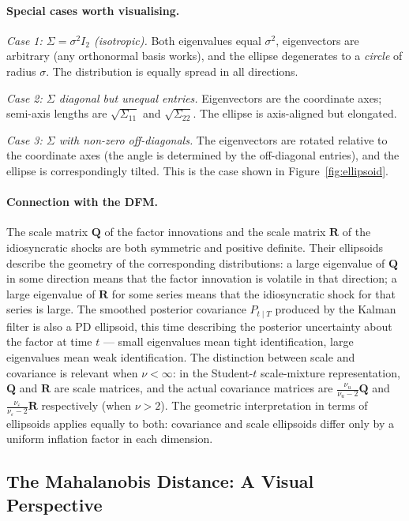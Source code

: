 \documentclass[11pt, a4paper, oneside]{article}
\begin{document}
\paragraph{Special cases worth visualising.}

\emph{Case 1: $\Sigma = \sigma^2 I_2$ (isotropic).} Both eigenvalues
equal $\sigma^2$, eigenvectors are arbitrary (any orthonormal basis
works), and the ellipse degenerates to a \emph{circle} of radius
$\sigma$. The distribution is equally spread in all directions.

\emph{Case 2: $\Sigma$ diagonal but unequal entries.} Eigenvectors are
the coordinate axes; semi-axis lengths are $\sqrt{\Sigma_{11}}$ and
$\sqrt{\Sigma_{22}}$. The ellipse is axis-aligned but elongated.

\emph{Case 3: $\Sigma$ with non-zero off-diagonals.} The eigenvectors
are rotated relative to the coordinate axes (the angle is determined
by the off-diagonal entries), and the ellipse is correspondingly
tilted. This is the case shown in Figure~\ref{fig:ellipsoid}.

\paragraph{Connection with the DFM.}
The scale matrix $\mathbf{Q}$ of the factor innovations and the scale
matrix $\mathbf{R}$ of the idiosyncratic shocks are both symmetric
and positive definite. Their ellipsoids describe the geometry of the
corresponding distributions: a large eigenvalue of $\mathbf{Q}$ in
some direction means that the factor innovation is volatile in that
direction; a large eigenvalue of $\mathbf{R}$ for some series means
that the idiosyncratic shock for that series is large. The smoothed
posterior covariance $P_{t \mid T}$ produced by the Kalman filter is
also a PD ellipsoid, this time describing the posterior uncertainty
about the factor at time $t$ — small eigenvalues mean tight
identification, large eigenvalues mean weak identification. The
distinction between scale and covariance is relevant when $\nu < \infty$:
in the Student-$t$ scale-mixture representation, $\mathbf{Q}$ and
$\mathbf{R}$ are scale matrices, and the actual covariance matrices
are $\tfrac{\nu_u}{\nu_u - 2}\mathbf{Q}$ and
$\tfrac{\nu_\varepsilon}{\nu_\varepsilon - 2}\mathbf{R}$ respectively
(when $\nu > 2$). The geometric interpretation in terms of ellipsoids
applies equally to both: covariance and scale ellipsoids differ only
by a uniform inflation factor in each dimension.

\subsection{The Mahalanobis Distance: A Visual Perspective}
\label{sec:appendix-mahalanobis}
\end{document}
